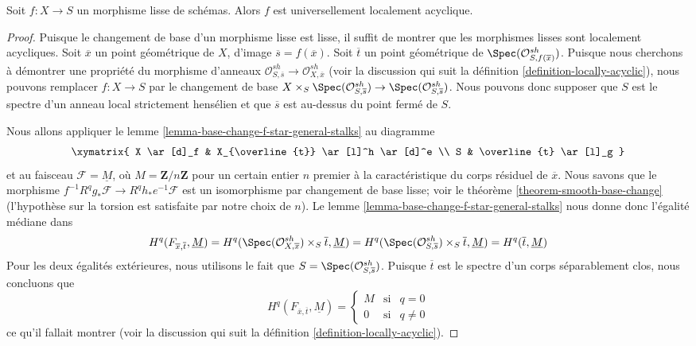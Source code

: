 \begin{proposition}
\label{proposition-smooth-locally-acyclic}
Soit $f : X \to S$ un morphisme lisse de schémas.
Alors $f$ est universellement localement acyclique.
\end{proposition}

\begin{proof}
Puisque le changement de base d'un morphisme lisse est lisse, il suffit
de montrer que les morphismes lisses sont localement acycliques.
Soit $\overline{x}$ un point géométrique de $X$, d'image
$\overline{s} = f(\overline{x})$. Soit
$\overline{t}$ un point géométrique de
$\Spec(\mathcal{O}^{sh}_{S, f(\overline{x})})$.
Puisque nous cherchons à démontrer une propriété du morphisme d'anneaux
$\mathcal{O}^{sh}_{S, \overline{s}} \to \mathcal{O}^{sh}_{X, \overline{x}}$
(voir la discussion qui suit la définition \ref{definition-locally-acyclic}),
nous pouvons remplacer $f : X \to S$ par le changement de base
$X \times_S \Spec(\mathcal{O}^{sh}_{S, \overline{s}}) \to
\Spec(\mathcal{O}^{sh}_{S, \overline{s}})$.
Nous pouvons donc supposer que $S$ est le spectre d'un anneau local
strictement hensélien et que $\overline{s}$ est au-dessus
du point fermé de $S$.

\medskip\noindent
Nous allons appliquer le lemme \ref{lemma-base-change-f-star-general-stalks}
au diagramme
$$
\xymatrix{
X \ar[d]_f & X_{\overline{t}} \ar[l]^h \ar[d]^e \\
S & \overline{t} \ar[l]_g
}
$$
et au faisceau $\mathcal{F} = \underline{M}$, où $M = \mathbf{Z}/n\mathbf{Z}$
pour un certain entier $n$ premier à la caractéristique du corps résiduel de
$\overline{x}$. Nous savons que le morphisme
$f^{-1}R^qg_*\mathcal{F} \to R^qh_*e^{-1}\mathcal{F}$
est un isomorphisme par changement de base lisse; voir le
théorème \ref{theorem-smooth-base-change} (l'hypothèse
sur la torsion est satisfaite par notre choix de $n$).
Le lemme \ref{lemma-base-change-f-star-general-stalks}
nous donne donc l'égalité médiane dans
$$
H^q(F_{\overline{x}, \overline{t}}, \underline{M}) =
H^q(\Spec(\mathcal{O}^{sh}_{X, \overline{x}}) \times_S \overline{t},
\underline{M})
=
H^q(\Spec(\mathcal{O}^{sh}_{S, \overline{s}}) \times_S \overline{t},
\underline{M}) =
H^q(\overline{t}, \underline{M})
$$
Pour les deux égalités extérieures, nous utilisons le fait que
$S = \Spec(\mathcal{O}^{sh}_{S, \overline{s}})$.
Puisque $\overline{t}$ est le spectre d'un corps séparablement
clos, nous concluons que
$$
H^q(F_{\overline{x}, \overline{t}}, \underline{M}) =
\left\{
\begin{matrix}
M & \text{si} & q = 0 \\
0 & \text{si} & q \not = 0
\end{matrix}
\right.
$$
ce qu'il fallait montrer (voir la discussion qui suit la
définition \ref{definition-locally-acyclic}).
\end{proof}

